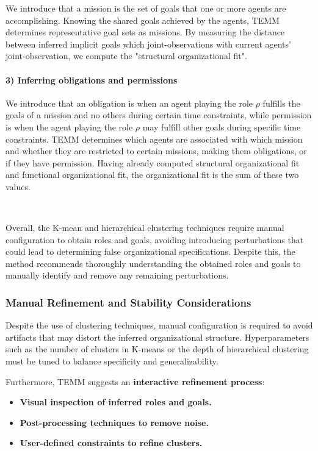 \documentclass[pdflatex,sn-mathphys-num]{sn-jnl}%
\theoremstyle{thmstyleone}%
\theoremstyle{thmstyletwo}%
\theoremstyle{thmstylethree}%
\begin{document}
We introduce that a mission is the set of goals that one or more agents are accomplishing.
Knowing the shared goals achieved by the agents, TEMM determines representative goal sets as missions.
By measuring the distance between inferred implicit goals which joint-observations with current agents' joint-observation, we compute the "structural organizational fit".

\paragraph{3) Inferring obligations and permissions}

We introduce that an obligation is when an agent playing the role $\rho$ fulfills the goals of a mission and no others during certain time constraints, while permission is when the agent playing the role $\rho$ may fulfill other goals during specific time constraints.
TEMM determines which agents are associated with which mission and whether they are restricted to certain missions, making them obligations, or if they have permission.
Having already computed structural organizational fit and functional organizational fit, the organizational fit is the sum of these two values.

\

Overall, the K-mean and hierarchical clustering techniques require manual configuration to obtain roles and goals, avoiding introducing perturbations that could lead to determining false organizational specifications. Despite this, the method recommends thoroughly understanding the obtained roles and goals to manually identify and remove any remaining perturbations.

\subsubsection{Manual Refinement and Stability Considerations}

Despite the use of clustering techniques, manual configuration is required to avoid artifacts that may distort the inferred organizational structure. Hyperparameters such as the number of clusters in K-means or the depth of hierarchical clustering must be tuned to balance specificity and generalizability.

Furthermore, TEMM suggests an \textbf{interactive refinement process}:
\begin{itemize}
    \item \textbf{Visual inspection of inferred roles and goals.}
    \item \textbf{Post-processing techniques to remove noise.}
    \item \textbf{User-defined constraints to refine clusters.}
\end{itemize}
\end{document}

